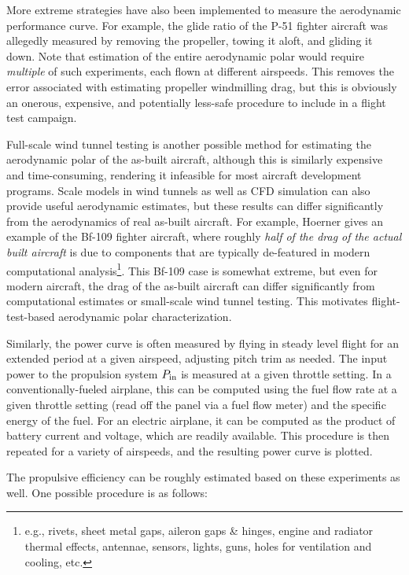 \documentclass[conf]{new-aiaa}
\begin{document}
    More extreme strategies have also been implemented to measure the aerodynamic performance curve. For example, the glide ratio of the P-51 fighter aircraft was allegedly measured by removing the propeller, towing it aloft, and gliding it down. Note that estimation of the entire aerodynamic polar would require \textit{multiple} of such experiments, each flown at different airspeeds. This removes the error associated with estimating propeller windmilling drag, but this is obviously an onerous, expensive, and potentially less-safe procedure to include in a flight test campaign.

    Full-scale wind tunnel testing is another possible method for estimating the aerodynamic polar of the as-built aircraft, although this is similarly expensive and time-consuming, rendering it infeasible for most aircraft development programs. Scale models in wind tunnels as well as CFD simulation can also provide useful aerodynamic estimates, but these results can differ significantly from the aerodynamics of real as-built aircraft. For example, Hoerner \cite{hoerner_fluid_1965} gives an example of the Bf-109 fighter aircraft, where roughly \textit{half of the drag of the actual built aircraft} is due to components that are typically de-featured in modern computational analysis\footnote{e.g., rivets, sheet metal gaps, aileron gaps \& hinges, engine and radiator thermal effects, antennae, sensors, lights, guns, holes for ventilation and cooling, etc.}. This Bf-109 case is somewhat extreme, but even for modern aircraft, the drag of the as-built aircraft can differ significantly from computational estimates or small-scale wind tunnel testing. This motivates flight-test-based aerodynamic polar characterization.

    Similarly, the power curve is often measured by flying in steady level flight for an extended period at a given airspeed, adjusting pitch trim as needed. The input power to the propulsion system $P_{\rm in}$ is measured at a given throttle setting. In a conventionally-fueled airplane, this can be computed using the fuel flow rate at a given throttle setting (read off the panel via a fuel flow meter) and the specific energy of the fuel. For an electric airplane, it can be computed as the product of battery current and voltage, which are readily available. This procedure is then repeated for a variety of airspeeds, and the resulting power curve is plotted.

    The propulsive efficiency can be roughly estimated based on these experiments as well. One possible procedure is as follows:
\end{document}
